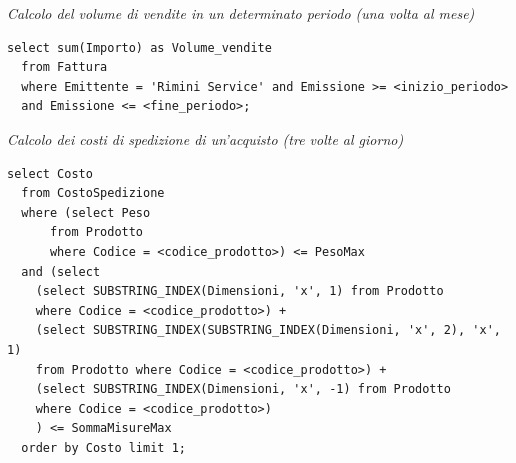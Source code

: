 \noindent{}
\newline\newline

\noindent\textit{Calcolo del volume di vendite in un determinato periodo (una volta al mese)}
\begin{verbatim}
select sum(Importo) as Volume_vendite
  from Fattura
  where Emittente = 'Rimini Service' and Emissione >= <inizio_periodo>
  and Emissione <= <fine_periodo>;
\end{verbatim}
\vspace{0.5cm}

\noindent{}
\newline\newline

\noindent\textit{Calcolo dei costi di spedizione di un'acquisto (tre volte al giorno)}
\begin{verbatim}
select Costo
  from CostoSpedizione
  where (select Peso
      from Prodotto
      where Codice = <codice_prodotto>) <= PesoMax
  and (select
    (select SUBSTRING_INDEX(Dimensioni, 'x', 1) from Prodotto
    where Codice = <codice_prodotto>) +
    (select SUBSTRING_INDEX(SUBSTRING_INDEX(Dimensioni, 'x', 2), 'x', 1)
    from Prodotto where Codice = <codice_prodotto>) +
    (select SUBSTRING_INDEX(Dimensioni, 'x', -1) from Prodotto
    where Codice = <codice_prodotto>)
    ) <= SommaMisureMax
  order by Costo limit 1;
\end{verbatim}
\vspace{0.5cm}

\noindent{}
\newline\newline
